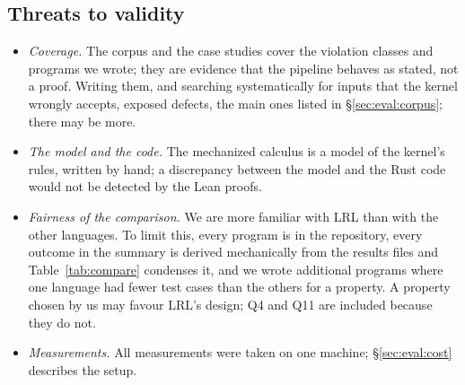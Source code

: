 \subsection{Threats to validity}\label{sec:eval:threats}

\begin{itemize}\setlength\itemsep{2pt}
\item \emph{Coverage.} The corpus and the case studies cover the violation classes and programs we wrote; they are evidence that the pipeline behaves as stated, not a proof. Writing them, and searching systematically for inputs that the kernel wrongly accepts, exposed defects, the main ones listed in \S\ref{sec:eval:corpus}; there may be more.
\item \emph{The model and the code.} The mechanized calculus is a model of the kernel's rules, written by hand; a discrepancy between the model and the Rust code would not be detected by the Lean proofs.
\item \emph{Fairness of the comparison.} We are more familiar with LRL than with the other languages. To limit this, every program is in the repository, every outcome in the summary is derived mechanically from the results files and Table~\ref{tab:compare} condenses it, and we wrote additional programs where one language had fewer test cases than the others for a property. A property chosen by us may favour LRL's design; Q4 and Q11 are included because they do not.
\item \emph{Measurements.} All measurements were taken on one machine; \S\ref{sec:eval:cost} describes the setup.
\end{itemize}
